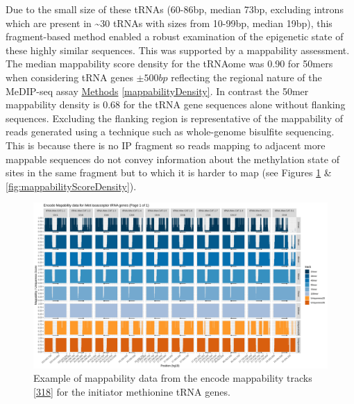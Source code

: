 \documentclass[
]{book}
\begin{document}
Due to the small size of these tRNAs (60-86bp, median 73bp, excluding introns which are present in \textasciitilde30 tRNAs with sizes from 10-99bp, median 19bp), this fragment-based method enabled a robust examination of the epigenetic state of these highly similar sequences.
This was supported by a mappability assessment.
The median mappability score density for the tRNAome was 0.90 for 50mers when considering tRNA genes \(\pm500bp\) reflecting the regional nature of the MeDIP-seq assay \protect\hyperlink{mappabilityDensity}{Methods} \ref{mappabilityDensity}.
In contrast the 50mer mappability density is 0.68 for the tRNA gene sequences alone without flanking sequences.
Excluding the flanking region is representative of the mappability of reads generated using a technique such as whole-genome bisulfite sequencing.
This is because there is no IP fragment so reads mapping to adjacent more mappable sequences do not convey information about the methylation state of sites in the same fragment but to which it is harder to map (see Figures \ref{fig:mappabilityiMet1} \& \ref{fig:mappabilityScoreDensity}).

\begin{figure}

{\centering \includegraphics[width=1\linewidth]{./figs/mappability-iMet1} 

}

\caption{Example of mappability data from the encode mappability tracks {[}\protect\hyperlink{ref-Derrien2012}{318}{]} for the initiator methionine tRNA genes.}\label{fig:mappabilityiMet1}
\end{figure}
\end{document}
